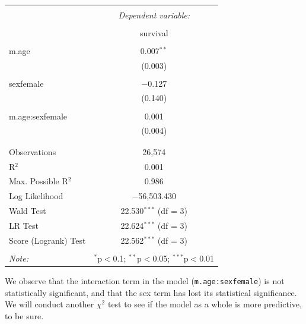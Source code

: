 \documentclass[12pt,letterpaper]{article}
\begin{document}
\begin{table}[!htbp] \centering   \caption{}   \label{} \begin{tabular}{@{\extracolsep{5pt}}lc} \\[-1.8ex]\hline \hline \\[-1.8ex]  & \multicolumn{1}{c}{\textit{Dependent variable:}} \\ \cline{2-2} \\[-1.8ex] & survival \\ \hline \\[-1.8ex]  m.age & 0.007$^{**}$ \\   & (0.003) \\   & \\  sexfemale & $-$0.127 \\   & (0.140) \\   & \\  m.age:sexfemale & 0.001 \\   & (0.004) \\   & \\ \hline \\[-1.8ex] Observations & 26,574 \\ R$^{2}$ & 0.001 \\ Max. Possible R$^{2}$ & 0.986 \\ Log Likelihood & $-$56,503.430 \\ Wald Test & 22.530$^{***}$ (df = 3) \\ LR Test & 22.624$^{***}$ (df = 3) \\ Score (Logrank) Test & 22.562$^{***}$ (df = 3) \\ \hline \hline \\[-1.8ex] \textit{Note:}  & \multicolumn{1}{r}{$^{*}$p$<$0.1; $^{**}$p$<$0.05; $^{***}$p$<$0.01} \\ \end{tabular} \end{table} 

\noindent We observe that the interaction term in the model (\texttt{m.age:sexfemale}) is not statistically significant, and that the sex term has lost its statistical significance. We will conduct another $\chi^2$ test to see if the model as a whole is more predictive, to be sure.
\end{document}
